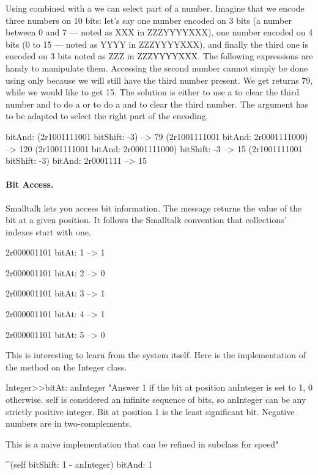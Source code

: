 \documentclass[a4paper,10pt,twoside]{book}
\begin{document}
Using  combined with a  we can select part of a number.
Imagine that we encode three numbers on 10 bits: let's say one number encoded on 3 bits (a number between 0 and 7 --- noted as XXX in ZZZYYYYXXX), one number encoded on 4 bits (0 to 15 --- noted as YYYY in ZZZYYYYXXX), and finally the third one is encoded on 3 bits noted as ZZZ in ZZZYYYYXXX. The following expressions are handy to manipulate them. Accessing the second number cannot simply be done using only  because we will still have the third number present. We get  returns 79, while we would like to get 15. The solution is either to use a  to clear the third number and to do a  or to do a  and to clear the third number. The  argument has to be adapted to select the right part of the encoding.

\begin{code}{bitAnd:}
(2r1001111001 bitShift: -3)
   --> 79
(2r1001111001 bitAnd: 2r0001111000)
   --> 120
(2r1001111001 bitAnd: 2r0001111000) bitShift: -3
   --> 15
(2r1001111001 bitShift: -3) bitAnd: 2r0001111   
   --> 15   
\end{code}

\paragraph*{Bit Access.}
Smalltalk lets you access bit information. The message  returns the value of the bit at a given position. It follows the Smalltalk convention that collections' indexes start with one. 

\begin{code}{}
2r000001101 bitAt: 1
	--> 1 
	
2r000001101 bitAt: 2
	--> 0 
			
2r000001101 bitAt: 3
	--> 1
	
2r000001101 bitAt: 4
	--> 1
	 
2r000001101 bitAt: 5
	--> 0 	 
\end{code}

This is interesting to learn from the system itself. Here is the implementation of the method  on the Integer class. 

\begin{code}{}
Integer>>bitAt: anInteger
	"Answer 1 if the bit at position anInteger is set to 1, 0 otherwise.
	self is considered an infinite sequence of bits, so anInteger can be any strictly positive integer.
	Bit at position 1 is the least significant bit.
	Negative numbers are in two-complements.
	
	This is a naive implementation that can be refined in subclass for speed"
	
	^(self bitShift: 1 - anInteger) bitAnd: 1
\end{code}
\end{document}
